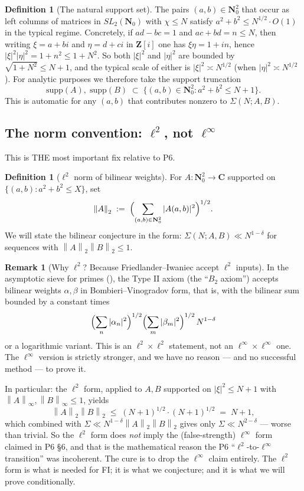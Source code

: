 \documentclass[11pt]{article}
\theoremstyle{definition}
\newtheorem{definition}[theorem]{Definition}
\newtheorem{remark}[theorem]{Remark}
\newcommand{\Nz}{\mathbf{N}_0}
\newcommand{\Z}{\mathbf{Z}}
\newcommand{\C}{\mathbf{C}}
\newcommand{\Zi}{\Z[i]}
\newcommand{\SLNz}{SL_2(\Nz)}
\newcommand{\norm}[1]{\left\lVert #1\right\rVert}
\begin{document}
\begin{definition}[The natural support set]\label{def:support-set}
The pairs $(a,b)\in\Nz^2$ that occur as left columns of matrices in $\SLNz$ with $\chi\le N$ satisfy $a^2+b^2\le N^{1/2}\cdot O(1)$ in the typical regime. Concretely, if $ad-bc=1$ and $ac+bd=n\le N$, then writing $\xi=a+bi$ and $\eta=d+ci$ in $\Zi$ one has $\xi\eta=1+in$, hence $|\xi|^2|\eta|^2=1+n^2\le 1+N^2$. So both $|\xi|^2$ and $|\eta|^2$ are bounded by $\sqrt{1+N^2}\le N+1$, and the typical scale of either is $|\xi|^2\asymp N^{1/2}$ (when $|\eta|^2\asymp N^{1/2}$). For analytic purposes we therefore take the support truncation
\[
\mathrm{supp}(A),\;\mathrm{supp}(B)\;\subset\;\{(a,b)\in\Nz^2:a^2+b^2\le N+1\}.
\]
This is automatic for any $(a,b)$ that contributes nonzero to $\Sigma(N;A,B)$.
\end{definition}

\subsection{The norm convention: $\ell^2$, not $\ell^\infty$}\label{ssec:setup-norm}

This is THE most important fix relative to P6.

\begin{definition}[$\ell^2$ norm of bilinear weights]\label{def:bilin-l2-norm}
For $A:\Nz^2\to\C$ supported on $\{(a,b):a^2+b^2\le X\}$, set
\[
\norm{A}_2\;:=\;\Bigl(\sum_{(a,b)\in\Nz^2}|A(a,b)|^2\Bigr)^{1/2}.
\]
We will state the bilinear conjecture in the form: $\Sigma(N;A,B)\ll N^{1-\delta}$ for sequences with $\norm{A}_2\norm{B}_2\le 1$.
\end{definition}

\begin{remark}[Why $\ell^2$? Because Friedlander--Iwaniec accept $\ell^2$ inputs]\label{rmk:FI-l2-suffices}
In the asymptotic sieve for primes (\cite{FI98a}), the Type II axiom (the ``$B_2$ axiom'') accepts bilinear weights $\alpha,\beta$ in Bombieri--Vinogradov form, that is, with the bilinear sum bounded by a constant times
\[
\Bigl(\sum_n|\alpha_n|^2\Bigr)^{1/2}\Bigl(\sum_m|\beta_m|^2\Bigr)^{1/2}\,N^{1-\delta}
\]
or a logarithmic variant. This is an $\ell^2\times\ell^2$ statement, not an $\ell^\infty\times\ell^\infty$ one. The $\ell^\infty$ version is strictly stronger, and we have no reason --- and no successful method --- to prove it.

In particular: the $\ell^2$ form, applied to $A,B$ supported on $|\xi|^2\le N+1$ with $\norm{A}_\infty,\norm{B}_\infty\le 1$, yields
\[
\norm{A}_2\norm{B}_2\;\le\; (N+1)^{1/2}\cdot (N+1)^{1/2}\;=\;N+1,
\]
which combined with $\Sigma\ll N^{1-\delta}\norm{A}_2\norm{B}_2$ gives only $\Sigma\ll N^{2-\delta}$ --- worse than trivial. So the $\ell^2$ form does \emph{not} imply the (false-strength) $\ell^\infty$ form claimed in P6 \S6, and that is the mathematical reason the P6 ``$\ell^2$-to-$\ell^\infty$ transition'' was incoherent. The cure is to drop the $\ell^\infty$ claim entirely. The $\ell^2$ form is what is needed for FI; it is what we conjecture; and it is what we will prove conditionally.
\end{remark}
\end{document}
